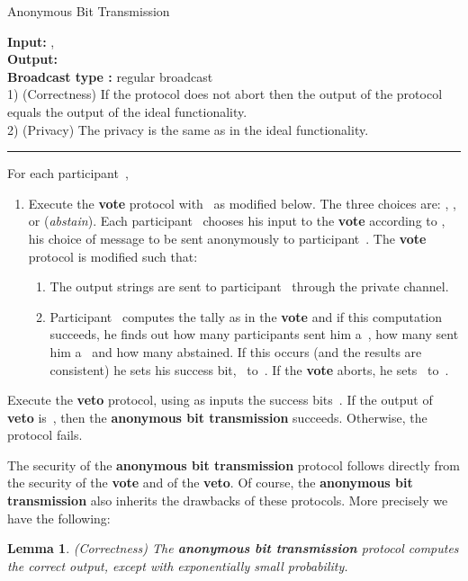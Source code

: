 \documentclass[11pt]{article}
\newtheorem{lemma}[theorem]{Lemma}
\begin{document}
\begin{protocol}
\caption{Anonymous Bit Transmission} \label{prot:anon-bit-trans}
{\bf Input:} ,  \\
{\bf Output:}  \\
{\bf Broadcast type :}  regular broadcast\\
1) (Correctness) If the protocol does not abort then the output of
the protocol
equals the output of the ideal functionality.   \\
2) (Privacy) The privacy is the same as in the ideal functionality.

 \vspace{4pt} \hrule \vspace{4pt}

For each participant~,
\begin{enumerate}
\item Execute the \textbf{vote} protocol with~ as modified below. The three choices are: , , or
 (\emph{abstain}). Each participant~ chooses his input to
the \textbf{vote} according to , his choice of message to be
sent anonymously to participant~. The \textbf{vote} protocol is
modified such that:
\begin{enumerate}
\item \label{Anon:broadcast}The output strings are sent to participant~
through the private channel.\item Participant~ computes the tally
as in the \textbf{vote}  and if this computation succeeds, he finds
out how many participants sent him a~, how many sent him a~
and how many abstained. If this occurs (and the results are
consistent) he sets his success bit,~ to~. If the
\textbf{vote} aborts, he sets~ to~.
\end{enumerate}
\end{enumerate}
Execute the \textbf{veto} protocol, using as inputs the success
bits~. If the output of \textbf{veto} is~, then the
\textbf{anonymous bit transmission} succeeds. Otherwise, the
protocol fails.
\end{protocol}

The security of the \textbf{anonymous bit transmission} protocol
follows directly from the security of the \textbf{vote}  and
of the \textbf{veto}. Of course, the \textbf{anonymous bit
transmission} also inherits the drawbacks of these protocols. More
precisely we have the following:

\begin{lemma}(Correctness)
The \textbf{anonymous bit transmission} protocol computes the
correct output, except with exponentially small probability.
\end{lemma}
\end{document}
